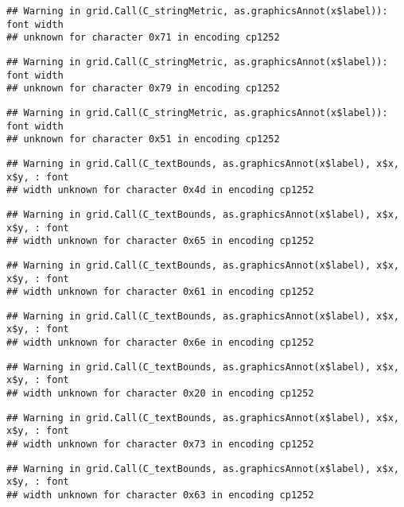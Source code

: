 \documentclass[
]{article}
\begin{document}
\begin{verbatim}
## Warning in grid.Call(C_stringMetric, as.graphicsAnnot(x$label)): font width
## unknown for character 0x71 in encoding cp1252
\end{verbatim}

\begin{verbatim}
## Warning in grid.Call(C_stringMetric, as.graphicsAnnot(x$label)): font width
## unknown for character 0x79 in encoding cp1252
\end{verbatim}

\begin{verbatim}
## Warning in grid.Call(C_stringMetric, as.graphicsAnnot(x$label)): font width
## unknown for character 0x51 in encoding cp1252
\end{verbatim}

\begin{verbatim}
## Warning in grid.Call(C_textBounds, as.graphicsAnnot(x$label), x$x, x$y, : font
## width unknown for character 0x4d in encoding cp1252
\end{verbatim}

\begin{verbatim}
## Warning in grid.Call(C_textBounds, as.graphicsAnnot(x$label), x$x, x$y, : font
## width unknown for character 0x65 in encoding cp1252
\end{verbatim}

\begin{verbatim}
## Warning in grid.Call(C_textBounds, as.graphicsAnnot(x$label), x$x, x$y, : font
## width unknown for character 0x61 in encoding cp1252
\end{verbatim}

\begin{verbatim}
## Warning in grid.Call(C_textBounds, as.graphicsAnnot(x$label), x$x, x$y, : font
## width unknown for character 0x6e in encoding cp1252
\end{verbatim}

\begin{verbatim}
## Warning in grid.Call(C_textBounds, as.graphicsAnnot(x$label), x$x, x$y, : font
## width unknown for character 0x20 in encoding cp1252
\end{verbatim}

\begin{verbatim}
## Warning in grid.Call(C_textBounds, as.graphicsAnnot(x$label), x$x, x$y, : font
## width unknown for character 0x73 in encoding cp1252
\end{verbatim}

\begin{verbatim}
## Warning in grid.Call(C_textBounds, as.graphicsAnnot(x$label), x$x, x$y, : font
## width unknown for character 0x63 in encoding cp1252
\end{verbatim}
\end{document}
